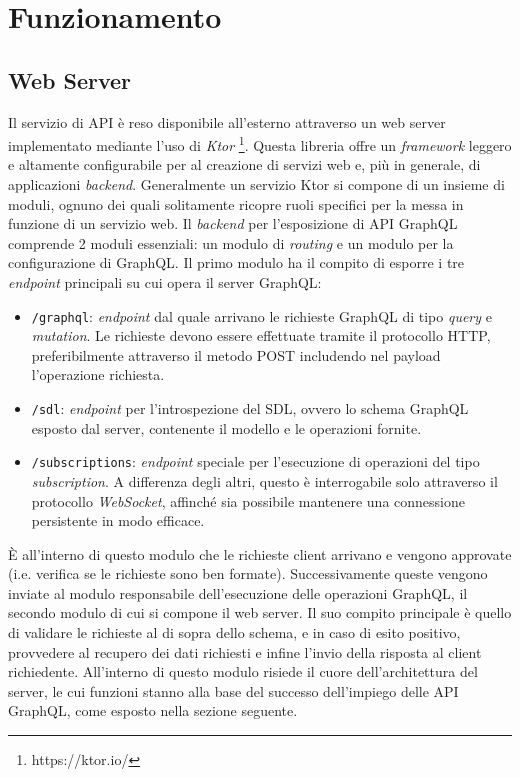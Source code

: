 \section{Funzionamento}\label{sec:functioning}
\subsection{Web Server}\label{ssec:web-server}
Il servizio di \ac{API} è reso disponibile all'esterno attraverso un web server implementato mediante l'uso di \textit{Ktor} \footnote{https://ktor.io/}. Questa libreria
offre un \textit{framework} leggero e altamente configurabile per al creazione di servizi web e, più in generale, di applicazioni \textit{backend}. Generalmente un
servizio Ktor si compone di un insieme di moduli, ognuno dei quali solitamente ricopre ruoli specifici per la messa in funzione di un servizio web. Il \textit{backend}
per l'esposizione di \ac{API} GraphQL comprende 2 moduli essenziali: un modulo di \textit{routing} e un modulo per la configurazione di GraphQL.
Il primo modulo ha il compito di esporre i tre \textit{endpoint} principali su cui opera il server GraphQL:
\begin{itemize}
    \item \texttt{/graphql}: \textit{endpoint} dal quale arrivano le richieste GraphQL di tipo \textit{query} e \textit{mutation}. Le richieste devono
        essere effettuate tramite il protocollo HTTP, preferibilmente attraverso il metodo POST includendo nel payload l'operazione richiesta.
    \item \texttt{/sdl}: \textit{endpoint} per l'introspezione del \ac{SDL}, ovvero lo schema GraphQL esposto dal server, contenente il modello e le operazioni fornite.
    \item \texttt{/subscriptions}: \textit{endpoint} speciale per l'esecuzione di operazioni del tipo \textit{subscription}. A differenza degli altri, questo è interrogabile
        solo attraverso il protocollo \textit{WebSocket}, affinché sia possibile mantenere una connessione persistente in modo efficace.
\end{itemize}

È all'interno di questo modulo che le richieste client arrivano e vengono approvate (i.e. verifica se le richieste sono ben formate). Successivamente queste vengono inviate
al modulo responsabile dell'esecuzione delle operazioni GraphQL, il secondo modulo di cui si compone il web server. Il suo compito principale è quello di validare le richieste
al di sopra dello schema, e in caso di esito positivo, provvedere al recupero dei dati richiesti e infine l'invio della risposta al client richiedente. All'interno di questo modulo
risiede il cuore dell'architettura del server, le cui funzioni stanno alla base del successo dell'impiego delle \ac{API} GraphQL, come esposto nella sezione seguente.

